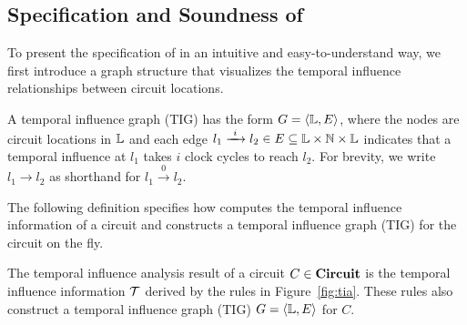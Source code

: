 \subsection{Specification and Soundness of \tia}

To present the specification of \tia in an intuitive and easy-to-understand way, we first introduce a graph structure that visualizes the temporal influence relationships between circuit locations.

\begin{definition}\label{def:tig}
    A temporal influence graph (TIG) has the form $G = \langle \mathbb{L}, E\rangle$, where the nodes are circuit locations in $\mathbb{L}$ and each edge $l_1 \xrightarrow{\ i\ } l_2 \in E \subseteq \mathbb{L} \times \mathbb{N} \times \mathbb{L}$ indicates that a temporal influence at $l_1$ takes $i$ clock cycles to reach $l_2$.
    For brevity, we write $l_1 \xrightarrow{\ \ \ } l_2$ as shorthand for $l_1 \xrightarrow{\ 0\ } l_2$.
\end{definition}

The following definition specifies how \tia computes the temporal influence information of a circuit and constructs a temporal influence graph (TIG) for the circuit on the fly.

\begin{definition}\label{def:tia}
    The temporal influence analysis result of a circuit $C \in \mathbf{Circuit}$ is the temporal influence information $\mathcal{T}$ derived by the rules in Figure~\ref{fig:tia}.
    These rules also construct a temporal influence graph (TIG) $G = \langle \mathbb{L}, E\rangle$ for $C$.
\end{definition}

